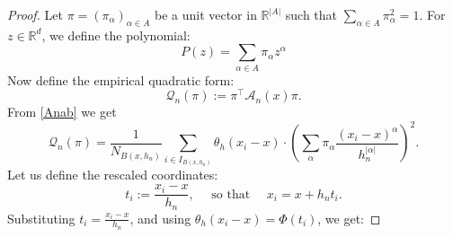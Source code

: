 \documentclass[10pt,a4paper]{amsart}
\begin{document}
\begin{proof} 
Let $\pi=\left(\pi_\alpha\right)_{\alpha \in A}$ be a unit vector in $\mathbb{R}^{|A|}$ such that $\sum_{\alpha\in A} \pi_\alpha^2=1$. For $z\in\mathbb{R}^d$, we define the polynomial:
$$
P(z)=\sum_{\alpha \in A} \pi_\alpha z^\alpha
$$
Now define the empirical quadratic form:
$$
\mathcal{Q}_n(\pi):=\pi^{\top} \mathscr{A}_n(x) \pi.
$$
From \eqref{Anab} we get
$$
\mathcal{Q}_n(\pi)=\frac{1}{N_{B\left(x, h_n\right)}} \sum_{i \in I_{B\left(x, h_n\right)}} \theta_h\left(x_i-x\right) \cdot\left(\sum_\alpha \pi_\alpha \frac{\left(x_i-x\right)^\alpha}{h_n^{|\alpha|}}\right)^2 .
$$
Let us define the rescaled coordinates:
$$
t_i:=\frac{x_i-x}{h_n}, \quad \text { so that } \quad x_i=x+h_n t_i.
$$
Substituting $t_i=\frac{x_i-x}{h_n}$, and using $\theta_h\left(x_i-x\right)=\Phi\left(t_i\right)$, we get:


\end{proof}
\end{document}
